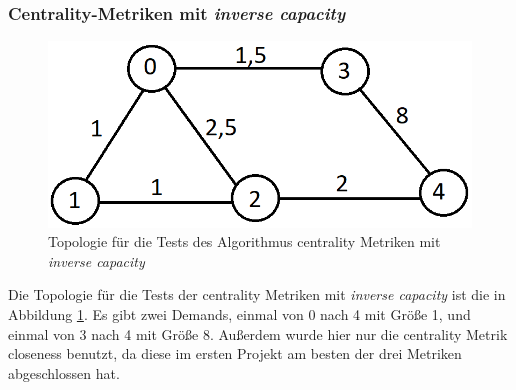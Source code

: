 \documentclass[sigconf, nonacm, review]{acmart}
\begin{document}
\subsubsection{Centrality-Metriken mit \emph{inverse capacity}}
\begin{figure}
\centering
\includegraphics[width=\linewidth]{figures/kai_p2_baseTopo.png}
\caption{Topologie f\"ur die Tests des Algorithmus centrality Metriken mit \emph{inverse capacity}}
\label{fig:kai_p2_baseTopo}
\end{figure}
Die Topologie f\"ur die Tests der centrality Metriken mit \emph{inverse capacity} ist die in Abbildung \ref{fig:kai_p2_baseTopo}.
Es gibt zwei Demands, einmal von 0 nach 4 mit Gr\"o\ss e 1, und einmal von 3 nach 4 mit Gr\"o\ss e 8.
Au\ss erdem wurde hier nur die centrality Metrik closeness benutzt, da diese im ersten Projekt am besten der drei Metriken abgeschlossen hat.
\end{document}
